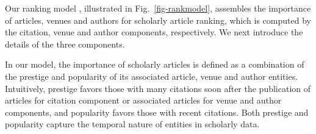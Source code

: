 Our ranking model \ensemblerank,  illustrated in Fig.~\ref{fig-rankmodel}, assembles the importance of articles, venues and authors for scholarly article ranking, which is computed by the citation, venue and author components, respectively.
%
We next introduce the details of the three components.


In our model, the importance of scholarly articles is defined as a combination of the prestige and popularity of its associated article, venue and author entities. Intuitively, prestige favors those with many citations soon after the publication of articles for citation component or associated articles for venue and author components, and popularity favors those with recent citations. Both prestige and popularity capture the temporal nature of entities in scholarly data.




